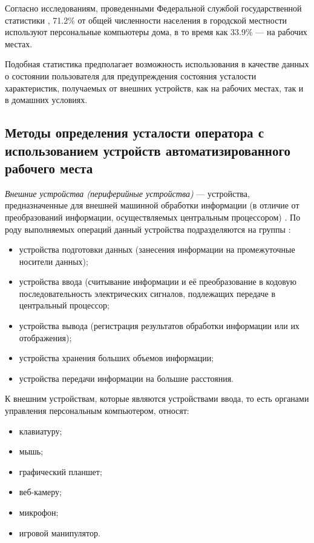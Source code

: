 Согласно исследованиям, проведенными Федеральной службой государственной статистики \cite{rosstatInvestigation}, 71.2\% от общей численности населения в городской местности используют персональные компьютеры дома, в то время как 33.9\% --- на рабочих местах.

Подобная статистика предполагает возможность использования в качестве данных о состоянии пользователя для предупреждения состояния усталости характеристик, получаемых от внешних устройств, как на рабочих местах, так и в домашних условиях.

\subsection{Методы определения усталости оператора с использованием устройств автоматизированного рабочего места}
\textit{Внешние устройства (периферийные устройства)} --- устройства, предназначенные для внешней машинной обработки информации (в отличие от преобразований информации, осуществляемых центральным процессором) \cite{polytechDic}. По роду выполняемых операций данный устройства подразделяются на группы \cite{polytechDic}: 
\begin{itemize}[leftmargin=1.6\parindent]
\item устройства подготовки данных (занесения информации на промежуточные носители данных);
\item устройства ввода (считывание информации и её преобразование в кодовую последовательность электрических сигналов, подлежащих передаче в центральный процессор;
\item устройства вывода (регистрация результатов обработки информации или их отображения);
\item устройства хранения больших объемов информации;
\item устройства передачи информации на большие расстояния.
\end{itemize}

К внешним устройствам, которые являются устройствами ввода, то есть органами управления персональным компьютером, относят:
\begin{itemize}[leftmargin=1.6\parindent]
\item клавиатуру;
\item мышь;
\item графический планшет;
\item веб-камеру;
\item микрофон;
\item игровой манипулятор.
\end{itemize}

